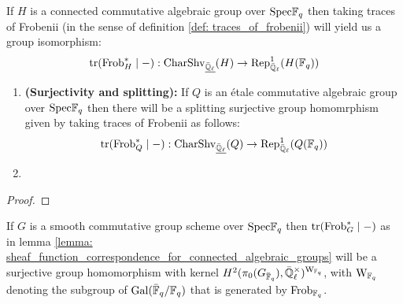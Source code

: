             \begin{lemma} \label{lemma: sheaf_function_correspondence_for_connected_algebraic_groups}
                \cite[Proposition 1.14]{cunningham_roe_function_sheaf_dictionary_quasi_characters_p_adic_tori} If $H$ is a connected commutative algebraic group over $\mathrm{Spec} \mathbb{F}_q$ then taking traces of Frobenii (in the sense of definition \ref{def: traces_of_frobenii}) will yield us a group isomorphism:
                    $$\operatorname{tr}(\mathrm{Frob}_H^* \mid -): \mathrm{Char}\mathrm{Shv}_{\underline{\bar{\mathbb{Q}}_{\ell}}}(H) \to \mathrm{Rep}_{\bar{\mathbb{Q}}_{\ell}}^1(H(\mathbb{F}_q))$$
            \end{lemma}
            \begin{lemma} \label{lemma: sheaf_function_correspondence_for_etale_commutative_group_schemes}
                \noindent
                \begin{enumerate}
                    \item \textbf{(Surjectivity and splitting):} \cite[Proposition 2.6]{cunningham_roe_function_sheaf_dictionary_quasi_characters_p_adic_tori} If $Q$ is an \'etale commutative algebraic group over $\mathrm{Spec} \mathbb{F}_q$ then there will be a splitting surjective group homomrphism given by taking traces of Frobenii as follows:
                        $$\operatorname{tr}(\mathrm{Frob}_Q^* \mid -): \mathrm{Char}\mathrm{Shv}_{\underline{\bar{\mathbb{Q}}_{\ell}}}(Q) \to \mathrm{Rep}_{\bar{\mathbb{Q}}_{\ell}}^1(Q(\mathbb{F}_q))$$
                    \item 
                \end{enumerate}
            \end{lemma}
                \begin{proof}
                    
                \end{proof}
            \begin{theorem} \label{theorem: sheaf_function_correspondence_for_smooth_groups}
                \cite[Theorem 3.6]{cunningham_roe_function_sheaf_dictionary_quasi_characters_p_adic_tori} If $G$ is a smooth commutative group scheme over $\mathrm{Spec} \mathbb{F}_q$ then $\operatorname{tr}(\mathrm{Frob}_G^* \mid -)$ as in lemma \ref{lemma: sheaf_function_correspondence_for_connected_algebraic_groups} will be a surjective group homomorphism with kernel $H^2(\pi_0(G_{\bar{\F}_q}), \bar{\Q}_{\ell}^{\x})^{\rmW_{\F_q}}$, with $\mathrm{W}_{\mathbb{F}_q}$ denoting the subgroup of $\mathrm{Gal}(\bar{\mathbb{F}}_q/\mathbb{F}_q)$ that is generated by $\mathrm{Frob}_{\mathbb{F}_q}$.
            \end{theorem}
